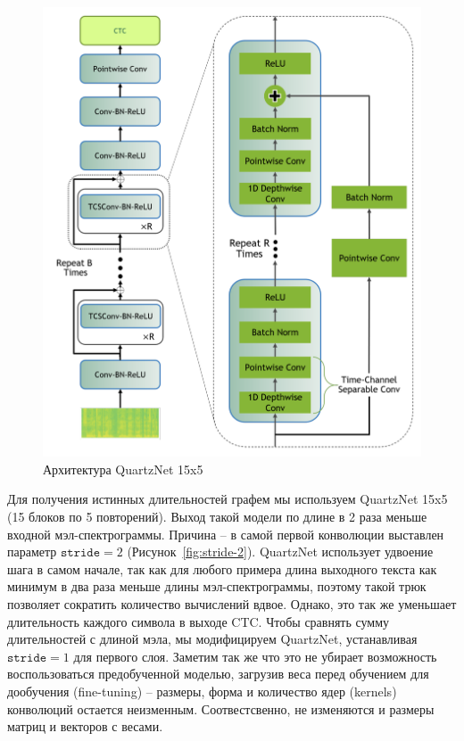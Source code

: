 \begin{figure}[!ht]
\centering
\includegraphics[width=1.0\textwidth]{images/qn.png}
\caption{Архитектура QuartzNet 15x5}
\label{fig:qn}
\end{figure}

Для получения истинных длительностей графем мы используем QuartzNet 15x5 (15 блоков по 5 повторений). Выход такой модели по длине в 2 раза меньше входной мэл-спектрограммы. Причина -- в самой первой конволюции выставлен параметр $\texttt{stride}=2$ (Рисунок~\ref{fig:stride-2}). QuartzNet использует удвоение шага в самом начале, так как для любого примера длина выходного текста как минимум в два раза меньше длины мэл-спектрограммы, поэтому такой трюк позволяет сократить количество вычислений вдвое. Однако, это так же уменьшает длительность каждого символа в выходе CTC. Чтобы сравнять сумму длительностей с длиной мэла, мы модифицируем QuartzNet, устанавливая $\texttt{stride}=1$ для первого слоя. Заметим так же что это не убирает возможность воспользоваться предобученной моделью, загрузив веса перед обучением для дообучения (fine-tuning) -- размеры, форма и количество ядер (kernels) конволюций остается неизменным. Соотвестсвенно, не изменяются и размеры матриц и векторов с весами.


